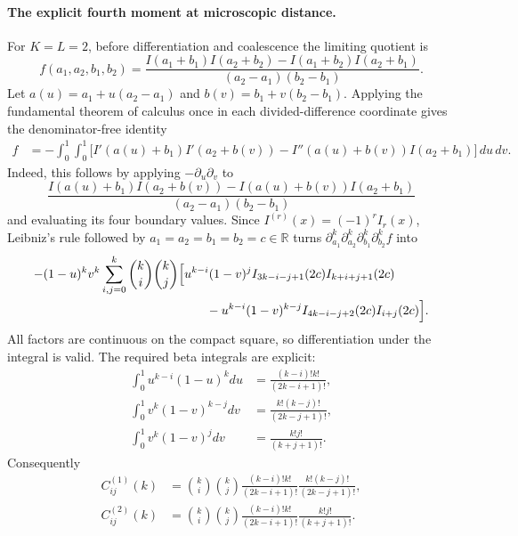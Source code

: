 \paragraph{The explicit fourth moment at microscopic distance.}
For $K=L=2$, before differentiation and coalescence the limiting quotient is
\begin{equation}
 f(a_1,a_2,b_1,b_2)
 =\frac{I(a_1+b_1)I(a_2+b_2)-I(a_1+b_2)I(a_2+b_1)}
 {(a_2-a_1)(b_2-b_1)}.
 \label{eq:GMS-audit-fourth-f}
\end{equation}
Let $a(u)=a_1+u(a_2-a_1)$ and $b(v)=b_1+v(b_2-b_1)$.  Applying the fundamental theorem of
calculus once in each divided-difference coordinate gives the denominator-free identity
\begin{align}
 f&=-\int_0^1\!\int_0^1
 \bigl[
 I'(a(u)+b_1)I'(a_2+b(v))
 -I''(a(u)+b(v))I(a_2+b_1)
 \bigr]\,du\,dv.
 \label{eq:GMS-audit-fourth-integral}
\end{align}
Indeed, this follows by applying $-\partial_u\partial_v$ to
\begin{equation}
 \frac{I(a(u)+b_1)I(a_2+b(v))-I(a(u)+b(v))I(a_2+b_1)}
 {(a_2-a_1)(b_2-b_1)}
\end{equation}
and evaluating its four boundary values.  Since
$I^{(r)}(x)=(-1)^rI_r(x)$, Leibniz's rule followed by
$a_1=a_2=b_1=b_2=c\in\mathbb R$ turns
$\partial_{a_1}^k\partial_{a_2}^k\partial_{b_1}^k\partial_{b_2}^k f$ into
\begin{align}
 -&(1-u)^kv^k\sum_{i,j=0}^{k}\binom ki\binom kj
 \Bigl[
 u^{k-i}(1-v)^j I_{3k-i-j+1}(2c)I_{k+i+j+1}(2c)\notag\\
 &\hspace{46mm}
 -u^{k-i}(1-v)^{k-j}I_{4k-i-j+2}(2c)I_{i+j}(2c)
 \Bigr].
 \label{eq:GMS-audit-fourth-integrand}
\end{align}
All factors are continuous on the compact square, so differentiation under the integral is
valid.  The required beta integrals are explicit:
\begin{align}
 \int_0^1u^{k-i}(1-u)^kdu&=\frac{(k-i)!k!}{(2k-i+1)!},\\
 \int_0^1v^k(1-v)^{k-j}dv&=\frac{k!(k-j)!}{(2k-j+1)!},\\
 \int_0^1v^k(1-v)^jdv&=\frac{k!j!}{(k+j+1)!}.
 \label{eq:GMS-audit-fourth-beta}
\end{align}
Consequently
\begin{align}
 C^{(1)}_{ij}(k)
 &=\binom ki\binom kj
 \frac{(k-i)!k!}{(2k-i+1)!}
 \frac{k!(k-j)!}{(2k-j+1)!},\\
 C^{(2)}_{ij}(k)
 &=\binom ki\binom kj
 \frac{(k-i)!k!}{(2k-i+1)!}
 \frac{k!j!}{(k+j+1)!}.
 \label{eq:GMS-audit-fourth-C}
\end{align}
